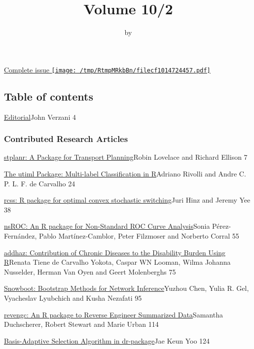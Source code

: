 \title{Volume 10/2}
\author{by }

\maketitle


\href{RJ-2018-2.pdf}{Complete issue
\protect\texttt{[image: /tmp/RtmpMRkbBn/filecf1014724457.pdf]}}

\hypertarget{table-of-contents}{%
\subsection{Table of contents}\label{table-of-contents}}

\href{../../news/RJ-2018-2-editorial}{Editorial}John Verzani 4

\hypertarget{contributed-research-articles}{%
\subsubsection{Contributed Research
Articles}\label{contributed-research-articles}}

\href{../../articles/RJ-2018-053}{stplanr: A Package for Transport
Planning}Robin Lovelace and Richard Ellison 7

\href{../../articles/RJ-2018-041}{The utiml Package: Multi-label
Classification in R}Adriano Rivolli and Andre C. P. L. F. de Carvalho 24

\href{../../articles/RJ-2018-054}{rcss: R package for optimal convex
stochastic switching}Juri Hinz and Jeremy Yee 38

\href{../../articles/RJ-2018-043}{nsROC: An R package for Non-Standard
ROC Curve Analysis}Sonia Pérez-Fernández, Pablo Martínez-Camblor, Peter
Filzmoser and Norberto Corral 55

\href{../../articles/RJ-2018-055}{addhaz: Contribution of Chronic
Diseases to the Disability Burden Using R}Renata Tiene de Carvalho
Yokota, Caspar WN Looman, Wilma Johanna Nusselder, Herman Van Oyen and
Geert Molenberghs 75

\href{../../articles/RJ-2018-056}{Snowboot: Bootstrap Methods for
Network Inference}Yuzhou Chen, Yulia R. Gel, Vyacheslav Lyubchich and
Kusha Nezafati 95

\href{../../articles/RJ-2018-044}{revengc: An R package to Reverse
Engineer Summarized Data}Samantha Duchscherer, Robert Stewart and Marie
Urban 114

\href{../../articles/RJ-2018-045}{Basis-Adaptive Selection Algorithm in
dr-package}Jae Keun Yoo 124


